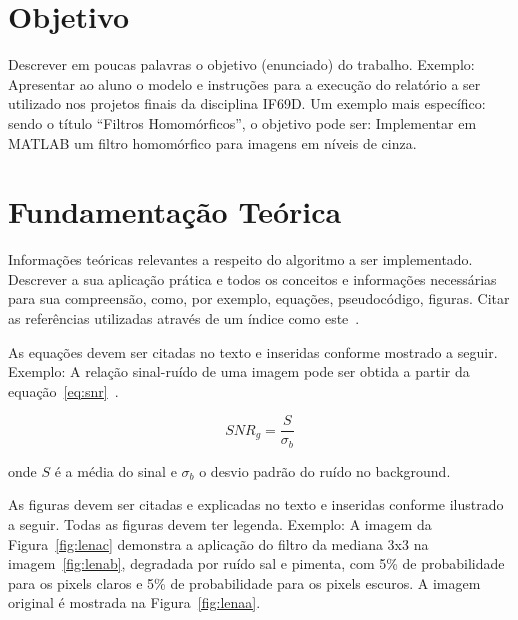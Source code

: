 \documentclass[11pt]{article}
\date{mês.ano} %
\begin{document}
\maketitle

\section{Objetivo}

Descrever em poucas palavras o objetivo (enunciado) do trabalho. Exemplo: Apresentar  ao aluno o modelo e instruções para a execução do relatório a ser utilizado nos projetos finais da disciplina IF69D. Um exemplo mais específico: sendo o título ``Filtros Homomórficos'', o objetivo pode ser: Implementar em MATLAB um filtro homomórfico para imagens em níveis de cinza. 


\section{Fundamentação Teórica}

Informações teóricas relevantes a respeito do algoritmo a ser implementado. Descrever a sua aplicação prática e todos os conceitos e informações necessárias para sua compreensão, como, por exemplo,  equações, pseudocódigo, figuras. Citar as referências utilizadas através de um índice como este~\cite{gonzalez:92}.

As equações devem ser citadas no texto e inseridas conforme mostrado a seguir. Exemplo: A relação sinal-ruído de uma imagem pode ser obtida a partir da equação~\ref{eq:snr}~\cite{kwan:99}.

\begin{equation} \label{eq:snr}
SNR_g = \frac{S}{\sigma_b}
\end{equation}

\noindent onde $S$ é a média do sinal e $\sigma_b$ o desvio padrão do ruído no background.

As figuras devem ser citadas e explicadas no texto e inseridas conforme ilustrado a seguir. Todas as figuras devem ter legenda. Exemplo: A imagem da Figura~\ref{fig:lenac} demonstra a aplicação do filtro da mediana 3x3 na imagem~\ref{fig:lenab}, degradada por ruído sal e pimenta, com 5\% de probabilidade para os pixels claros e 5\% de probabilidade para os pixels escuros. A imagem original é mostrada na Figura~\ref{fig:lenaa}.
\end{document}
